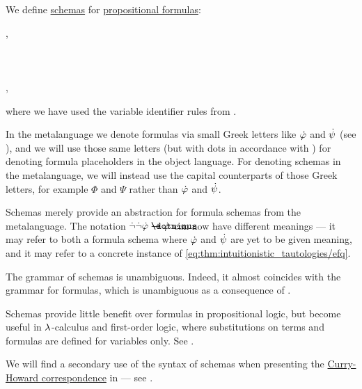 \begin{definition}\label{def:propositional_formula_schema}\mimprovised
  We define \hyperref[con:schemas_and_instances]{schemas} for \hyperref[def:propositional_syntax/formula]{propositional formulas}:
  \begin{bnf*}
     {}, \\
          {\bnftsq{\( \syntop \)} \bnfor \bnftsq{\( \synbot \)} \bnfor} \\
     \\
     \\
    ,
  \end{bnf*}
  where we have used the variable identifier rules from .
\end{definition}
\begin{comments}
  \item In the metalanguage we denote formulas via small Greek letters like \( \dot{\varphi} \) and \( \dot{\psi} \) (see ), and we will use those same letters (but with dots in accordance with ) for denoting formula placeholders in the object language. For denoting schemas in the metalanguage, we will instead use the capital counterparts of those Greek letters, for example \( \Phi \) and \( \Psi \) rather than \( \dot{\varphi} \) and \( \dot{\psi} \).

  \item Schemas merely provide an abstraction for formula schemas from the metalanguage. The notation \( \synneg \synneg \syn\varphi \synimplies \syn\varphi \) can now have different meanings --- it may refer to both a formula schema where \( \dot{\varphi} \) and \( \dot{\psi} \) are yet to be given meaning, and it may refer to a concrete instance of \eqref{eq:thm:intuitionistic_tautologies/efq}.

  \item The grammar of schemas is unambiguous. Indeed, it almost coincides with the grammar for formulas, which is unambiguous as a consequence of .

  \item Schemas provide little benefit over formulas in propositional logic, but become useful in \( {\mathrm \lambda} \)-calculus and first-order logic, where substitutions on terms and formulas are defined for variables only. See .

  \item We will find a secondary use of the syntax of schemas when presenting the \hyperref[con:curry_howard_correspondence]{Curry-Howard correspondence} in  --- see .

\end{comments}

